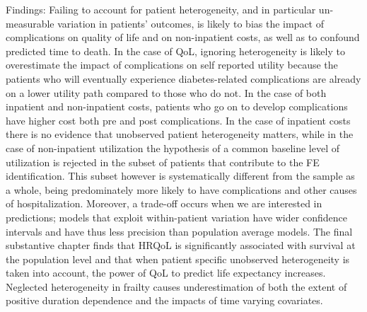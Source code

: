 {Findings: Failing to account for patient heterogeneity, and in particular un-measurable variation in patients’ outcomes, is likely to bias the impact of complications on quality of life and on non-inpatient costs, as well as to confound predicted time to death. In the case of QoL, ignoring heterogeneity is likely to overestimate the impact of complications on self reported utility because the patients who will eventually experience diabetes-related complications are already on a lower utility path compared to those who do not. In the case of both inpatient and non-inpatient costs, patients who go on to develop complications have higher cost both pre and post complications. In the case of inpatient costs there is no evidence that unobserved patient heterogeneity matters, while in the case of non-inpatient utilization the hypothesis of a common baseline level of utilization is rejected in the subset of patients that contribute to the FE identification. This subset however is systematically different from the sample as a whole, being predominately more likely to have complications and other causes of hospitalization. Moreover, a trade-off occurs when we are interested in predictions; models that exploit within-patient variation have wider confidence intervals and have thus less precision than population average models. The final substantive chapter finds that HRQoL is significantly associated with survival at the population level and that when patient specific unobserved heterogeneity is taken into account, the power of QoL to predict life expectancy increases. Neglected heterogeneity in frailty causes underestimation of both the extent of positive duration dependence and the impacts of time varying covariates.}
